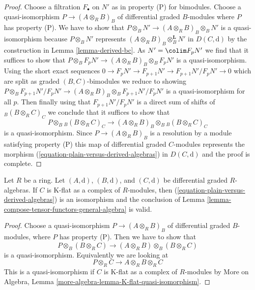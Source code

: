 \begin{proof}
\medskip\noindent
Choose a filtration $F_\bullet$ on $N'$ as in property (P) for bimodules.
Choose a quasi-isomorphism $P \to (A \otimes_R B)_B$
of differential graded $B$-modules where $P$ has property (P).
We have to show that
$P \otimes_B N' \to (A \otimes_R B)_B \otimes_B N'$ is
a quasi-isomorphism because $P \otimes_B N'$ represents
$(A \otimes_R B)_B \otimes_B^\mathbf{L} N'$ in $D(C, \text{d})$
by the construction in Lemma \ref{lemma-derived-bc}.
As $N' = \colim F_pN'$ we find
that it suffices to show that
$P \otimes_B F_pN' \to (A \otimes_R B)_B \otimes_B F_pN'$
is a quasi-isomorphism. Using the short exact sequences
$0 \to F_pN' \to F_{p + 1}N' \to F_{p + 1}N'/F_pN' \to 0$
which are split as graded $(B, C)$-bimodules we reduce to showing
$P \otimes_B F_{p + 1}N'/F_pN' \to
(A \otimes_R B)_B \otimes_B F_{p + 1}N'/F_pN'$
is a quasi-isomorphism for all $p$.
Then finally using that $F_{p + 1}N'/F_pN'$
is a direct sum of shifts of ${}_B(B \otimes_R C)_C$
we conclude that it suffices to show that
$$
P \otimes_B {}_B(B \otimes_R C)_C \to
(A \otimes_R B)_B \otimes_B {}_B(B \otimes_R C)_C
$$
is a quasi-isomorphism. Since $P \to (A \otimes_R B)_B$
is a resolution by a module satisfying property (P)
this map of differential graded $C$-modules
represents the morphism (\ref{equation-plain-versus-derived-algebras})
in $D(C, \text{d})$ and the proof is complete.
\end{proof}

\begin{lemma}
\label{lemma-compose-tensor-functors}
Let $R$ be a ring. Let $(A, \text{d})$, $(B, \text{d})$, and
$(C, \text{d})$ be differential graded $R$-algebras.
If $C$ is K-flat as a complex of $R$-modules, then
(\ref{equation-plain-versus-derived-algebras})
is an isomorphism and the conclusion of
Lemma \ref{lemma-compose-tensor-functors-general-algebra} is valid.
\end{lemma}

\begin{proof}
Choose a quasi-isomorphism $P \to (A \otimes_R B)_B$ of differential
graded $B$-modules, where $P$ has property (P). Then we have to show
that
$$
P \otimes_B (B \otimes_R C) \longrightarrow
(A \otimes_R B) \otimes_B (B \otimes_R C)
$$
is a quasi-isomorphism. Equivalently we are looking at
$$
P \otimes_R C \longrightarrow
A \otimes_R B \otimes_R C
$$
This is a quasi-isomorphism if $C$ is K-flat as a complex of $R$-modules by
More on Algebra, Lemma \ref{more-algebra-lemma-K-flat-quasi-isomorphism}.
\end{proof}






